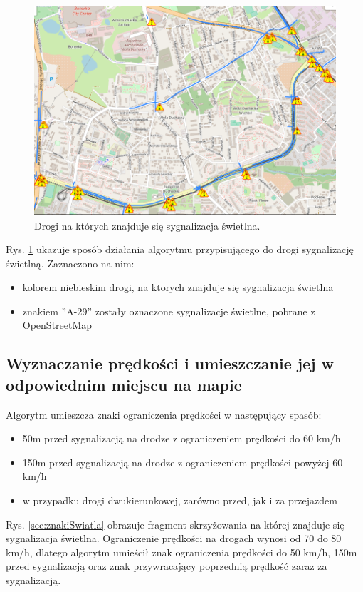 \begin{figure}[h]
\caption{Drogi na których znajduje się sygnalizacja świetlna.}
\label{sec:PrzejazdyKolejowe}
\centering
\includegraphics[width=1.1\textwidth]{traffic_sight}
\end{figure}

Rys. \ref{sec:PrzejazdyKolejowe} ukazuje sposób działania algorytmu przypisującego do drogi sygnalizację świetlną. Zaznaczono na nim:
\begin{itemize}
\item kolorem niebieskim drogi, na ktorych znajduje się sygnalizacja świetlna
\item znakiem ''A-29'' zostały oznaczone sygnalizacje świetlne, pobrane z OpenStreetMap
\end{itemize}

\newpage
\subsection{Wyznaczanie prędkości i umieszczanie jej w odpowiednim miejscu na mapie}

Algorytm umieszcza znaki ograniczenia prędkości w następujący spasób:
\begin{itemize}
\item 50m przed sygnalizacją na drodze z ograniczeniem prędkości do 60 km/h
\item 150m przed sygnalizacją na drodze z ograniczeniem prędkości powyżej 60 km/h
\item w przypadku drogi dwukierunkowej, zarówno przed, jak i za przejazdem
\end{itemize}


Rys. \ref{sec:znakiSwiatla} obrazuje fragment skrzyżowania na której znajduje się sygnalizacja świetlna. Ograniczenie prędkości na drogach wynosi od 70 do 80 km/h, dlatego algorytm umieścił znak ograniczenia prędkości do 50 km/h, 150m przed sygnalizacją oraz znak przywracający poprzednią prędkość zaraz za sygnalizacją.

